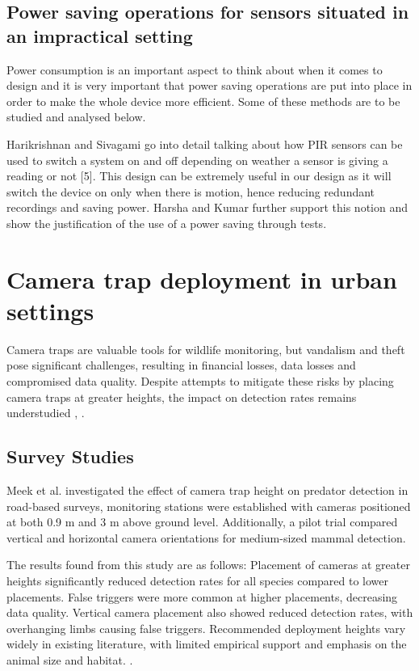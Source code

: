 \documentclass[class=report,11pt,crop=false]{standalone}
\begin{document}
\subsection{Power saving operations for sensors situated in an impractical setting}

Power consumption is an important aspect to think about when it comes to design and it is very important that power saving operations are put into place in order to make the whole device more efficient. Some of these methods are to be studied and analysed below.

Harikrishnan and Sivagami \cite{harikirshnan2017intelligent} go into detail talking about how PIR sensors can be used to switch a system on and off depending on weather a sensor is giving a reading or not [5]. This design can be extremely useful in our design as it will switch the device on only when there is motion, hence reducing redundant recordings and saving power. Harsha and Kumar \cite{harsha2020home} further support this notion and show the justification of the use of a power saving through tests.



\section{Camera trap deployment in urban settings} 

Camera traps are valuable tools for wildlife monitoring, but vandalism and theft pose significant challenges, resulting in financial losses, data losses and compromised data quality. Despite attempts to mitigate these risks by placing camera traps at greater heights, the impact on detection rates remains understudied \cite{meek2016higher}, \cite{meek2019camera}.


\subsection{Survey Studies}

Meek et al. \cite{meek2016higher} investigated the effect of camera trap height on predator detection in road-based surveys, monitoring stations were established with cameras positioned at both 0.9 m and 3 m above ground level. Additionally, a pilot trial compared vertical and horizontal camera orientations for medium-sized mammal detection. 

The results found from this study are as follows: Placement of cameras at greater heights significantly reduced detection rates for all species compared to lower placements. False triggers were more common at higher placements, decreasing data quality. Vertical camera placement also showed reduced detection rates, with overhanging limbs causing false triggers. Recommended deployment heights vary widely in existing literature, with limited empirical support and emphasis on the animal size and habitat. \cite{meek2016higher}. 
\end{document}
